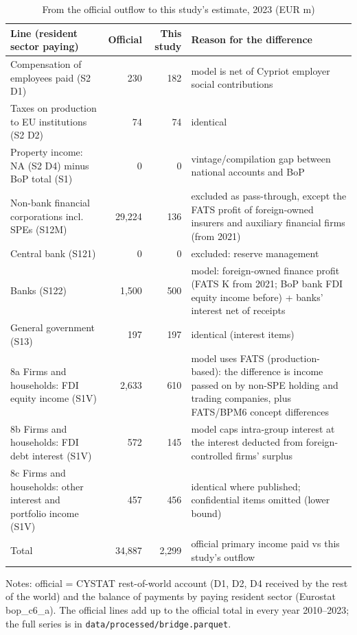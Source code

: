 \begin{table}[!htbp]
\centering
\footnotesize
\caption{From the official outflow to this study's estimate, 2023 (EUR m)}
\label{tab:bridge}
\setlength{\tabcolsep}{3pt}
\begin{tabular}{>{\raggedright\arraybackslash}p{}rr>{\raggedright\arraybackslash}p{}}
\toprule
Line (resident sector paying) & Official & This study & Reason for the difference \\
\midrule
1 Compensation of employees paid (S2 D1) & 230 & 182 & model is net of Cypriot employer social contributions \\
2 Taxes on production to EU institutions (S2 D2) & 74 & 74 & identical \\
3 Property income: NA (S2 D4) minus BoP total (S1) & 0 & 0 & vintage/compilation gap between national accounts and BoP \\
4 Non-bank financial corporations incl. SPEs (S12M) & 29,224 & 136 & excluded as pass-through, except the FATS profit of foreign-owned insurers and auxiliary financial firms (from 2021) \\
5 Central bank (S121) & 0 & 0 & excluded: reserve management \\
6 Banks (S122) & 1,500 & 500 & model: foreign-owned finance profit (FATS K from 2021; BoP bank FDI equity income before) + banks' interest net of receipts \\
7 General government (S13) & 197 & 197 & identical (interest items) \\
8a Firms and households: FDI equity income (S1V) & 2,633 & 610 & model uses FATS (production-based): the difference is income passed on by non-SPE holding and trading companies, plus FATS/BPM6 concept differences \\
8b Firms and households: FDI debt interest (S1V) & 572 & 145 & model caps intra-group interest at the interest deducted from foreign-controlled firms' surplus \\
8c Firms and households: other interest and portfolio income (S1V) & 457 & 456 & identical where published; confidential items omitted (lower bound) \\
Total & 34,887 & 2,299 & official primary income paid vs this study's outflow \\
\bottomrule
\end{tabular}

\smallskip
\begin{minipage}{0.95\textwidth}\footnotesize Notes: official = CYSTAT rest-of-world account (D1, D2, D4 received by the rest of the world) and the balance of payments by paying resident sector (Eurostat bop\_c6\_a). The official lines add up to the official total in every year 2010--2023; the full series is in \texttt{data/processed/bridge.parquet}.\end{minipage}
\end{table}
